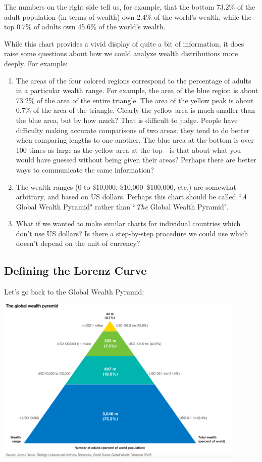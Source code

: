 \documentclass[12pt]{memoir}\usepackage[]{graphicx}\usepackage[table]{xcolor}
\begin{document}
The numbers on the right side tell us, for example, that the bottom 73.2\%
of the adult population (in terms of wealth) own 2.4\% of the world's 
wealth, while the top 0.7\% of adults own 45.6\% of the world's wealth. 

While this chart provides a vivid display of quite a bit of information, it does
raise some questions about how we could analyze wealth distributions more deeply.
For example:

\begin{enumerate}
\item The areas of the four colored regions correspond to the percentage
of adults in a particular wealth range.  For example, the area of the blue region
is about 73.2\% of the area of the entire triangle.  The area of the yellow peak
is about 0.7\% of the area of the triangle.  Clearly the yellow area is much smaller
than the blue area, but by how much?  That is difficult to judge.  People have 
difficulty making accurate comparisons of two areas; they tend to do better
when comparing lengths to one another.  The blue area
at the bottom is over 100 times as large as the yellow area at the top---is
that about what you would have guessed without being given their areas?
Perhaps there are better ways to communicate the same information? 

\item The wealth ranges (0 to \$10{,}000, \$10{,}000--\$100{,}000, etc.) are 
somewhat arbitrary, and based on US dollars.  Perhaps this chart should be 
called ``\emph{A} Global Wealth Pyramid" rather than ``\emph{The} Global Wealth
Pyramid".  

\item What if we wanted to make similar charts for individual countries
which don't use US dollars?  Is there a step-by-step procedure we could use
which doesn't depend on the unit of currency? 
\end{enumerate}

\subsection*{Defining the Lorenz Curve}
\bigskip
Let's go back to the Global Wealth Pyramid:

\begin{center}
\includegraphics[width = 12cm]{graphs/globalwealthpyramid2016.png}
\end{center}
\end{document}
